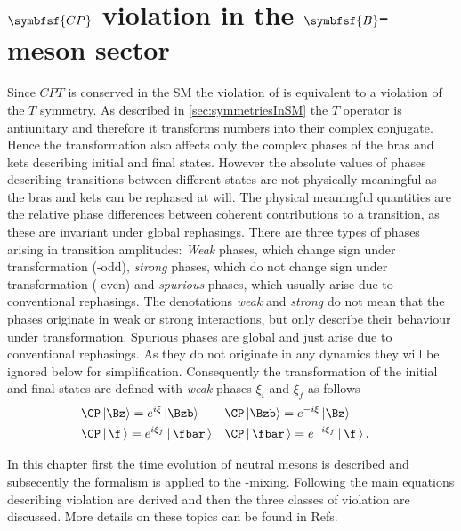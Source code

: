 \chapter[head={\CP violation in the $B$-meson sector},tocentry={$\symbfsf{C{}P}$ violation in the $\symbfsf{B}$-meson sector}]
{$\symbfsf{C{}P}$ violation in the $\symbfsf{B}$-meson sector}
\label{chap:CPV}

Since $CPT$ is conserved in the \ac{SM} the violation of \CP is equivalent to a violation of the $T$ symmetry.
As described in \cref{sec:symmetriesInSM} the $T$ operator is antiunitary and therefore it transforms numbers into their complex conjugate.
Hence the \CP transformation also affects only the complex phases of the bras and kets describing initial and final states.
However the absolute values of phases describing transitions between different states are not physically meaningful as the bras and kets can be rephased at will.
The physical meaningful quantities are the relative phase differences between coherent contributions to a transition, as these are invariant under global rephasings.
There are three types of phases arising in transition amplitudes:
\emph{Weak} phases, which change sign under \CP transformation (\CP-odd), \emph{strong} phases, which do not change sign under \CP transformation (\CP-even) and \emph{spurious} phases, which usually arise due to conventional rephasings.
The denotations \emph{weak} and \emph{strong} do not mean that the phases originate in weak or strong interactions, but only describe their behaviour under \CP transformation.
Spurious phases are global and just arise due to conventional rephasings.
As they do not originate in any dynamics they will be ignored below for simplification.
Consequently the \CP transformation of the initial and final states are defined with \emph{weak} phases $\xi_i$ and $\xi_f$ as follows
\begin{equation}
\begin{aligned}
&\CP\left|\Bz\right> =e^{i\xi}\left|\Bzb\right>&&\CP\left|\Bzb\right>=e^{-i\xi}\left|\Bz\right>&\\
&\CP\left|\,\f\,\right> =e^{i\xi_f}\left|\,\fbar\,\right>&&\CP\left|\,\fbar\,\right>=e^{-i\xi_f}\left|\,\f\,\right>.& \label{eq:CPTransInitFinal}
\end{aligned}
\end{equation}

In this chapter first the time evolution of neutral mesons is described and subsecently the formalism is applied to the \Bz-\Bzb mixing.
Following the main equations describing \CP violation are derived and then the three classes of \CP violation are discussed.
More details on these topics can be found in Refs.~\cite{Branco:396964,Bigi:1295518}

